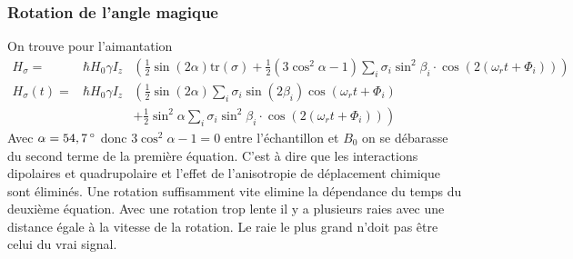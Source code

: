 \documentclass[a4paper,12pt]{scrartcl}
\begin{document}
   \subsubsection{Rotation de l'angle magique}
    On trouve pour l'aimantation
    \begin{eqnarray*}
     H_{\sigma}=&\hbar H_0\gamma I_z&\left(\frac{1}{2}\sin\left(2\alpha\right)\text{tr}\left(\sigma\right)+\frac{1}{2}\left(3\cos^2\alpha-1\right)\sum_i\sigma_i\sin^2\beta_i\cdot\cos\left(2\left(\omega_r t+\Phi_i\right)\right)\right)\\
     H_{\sigma}\left(t\right)=&\hbar H_0\gamma I_z&\left(\frac{1}{2}\sin\left(2\alpha\right)\sum_i\sigma_i\sin\left(2\beta_i\right)\cos\left(\omega_r t+\Phi_i\right)\right.\\
		& & \left.+\frac{1}{2}\sin^2\alpha \sum_i\sigma_i\sin^2\beta_i\cdot\cos\left(2\left(\omega_r t+\Phi _i\right)\right)\right)
    \end{eqnarray*}
    Avec $\alpha=\unit[54,7]{\degree}$ donc $3\cos^2\alpha-1=0$ entre l'échantillon et $B_0$ on se débarasse du second terme de la première équation. C'est à dire que les interactions dipolaires et quadrupolaire et l'effet de l'anisotropie de déplacement chimique sont éliminés. Une rotation suffisamment vite elimine la dépendance du temps du deuxième équation. Avec une rotation trop lente il y a plusieurs raies avec une distance égale à la vitesse de la rotation. Le raie le plus grand n'doit pas être celui du vrai signal. 
\end{document}
